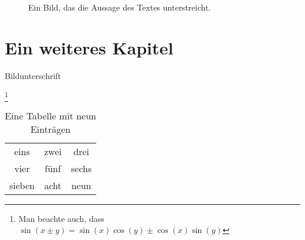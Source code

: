 
\blinddocument
{}

\begin{figure}[h]
  \centering
  \caption{Ein Bild, das die Aussage des Textes unterstreicht.}
  \label{statement}
\end{figure}







\chapter{Ein weiteres Kapitel}

\caption{Bildunterschrift}
\label{introduction}

\Blindtext\footnote{Man beachte auch, dass $\sin(x\pm y) = \sin(x)\cos(y) \pm \cos(x)\sin(y)$}

\begin{table}[h]
  \centering
  \begin{tabular}{ccc}
  \toprule
  eins & zwei & drei\\
  vier & fünf & sechs\\
  sieben & acht & neun\\
  \bottomrule
  \end{tabular}
  \caption{Eine Tabelle mit neun Einträgen}
  \label{tabelle3}
\end{table}
